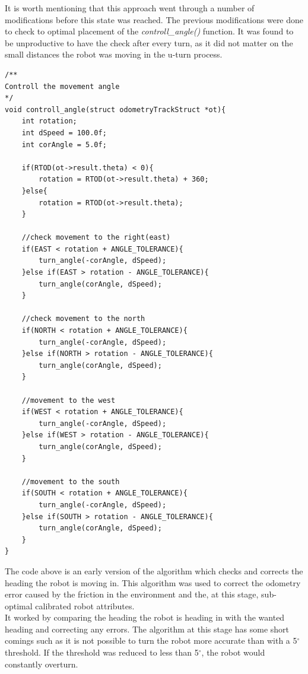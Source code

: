 It is worth mentioning that this approach went through a number of modifications before this state was reached. The previous modifications were done to check to optimal placement of the \textit{controll\_angle()} function. It was found to be unproductive to have the check after every turn, as it did not matter on the small distances the robot was moving in the u-turn process. \\

\begin{lstlisting}[caption={Early heading correction algorithm}, label={early_heading}]
 /**
Controll the movement angle
*/
void controll_angle(struct odometryTrackStruct *ot){
	int rotation;
	int dSpeed = 100.0f;
	int corAngle = 5.0f;

	if(RTOD(ot->result.theta) < 0){
		rotation = RTOD(ot->result.theta) + 360;
	}else{
		rotation = RTOD(ot->result.theta);
	}

	//check movement to the right(east)
	if(EAST < rotation + ANGLE_TOLERANCE){
		turn_angle(-corAngle, dSpeed);
	}else if(EAST > rotation - ANGLE_TOLERANCE){
		turn_angle(corAngle, dSpeed);
	}

	//check movement to the north
	if(NORTH < rotation + ANGLE_TOLERANCE){
		turn_angle(-corAngle, dSpeed);
	}else if(NORTH > rotation - ANGLE_TOLERANCE){
		turn_angle(corAngle, dSpeed);
	}

	//movement to the west
	if(WEST < rotation + ANGLE_TOLERANCE){
		turn_angle(-corAngle, dSpeed);
	}else if(WEST > rotation - ANGLE_TOLERANCE){
		turn_angle(corAngle, dSpeed);
	}

	//movement to the south
	if(SOUTH < rotation + ANGLE_TOLERANCE){
		turn_angle(-corAngle, dSpeed);
	}else if(SOUTH > rotation - ANGLE_TOLERANCE){
		turn_angle(corAngle, dSpeed);
	}
}
\end{lstlisting}
The code above is an early version of the algorithm which checks and corrects the heading the robot is moving in. This algorithm was used to correct the odometry error caused by the friction in the environment and the, at this stage, sub-optimal calibrated robot attributes. \\
It worked by comparing the heading the robot is heading in with the wanted heading and correcting any errors. The algorithm at this stage has some short comings such as it is not possible to turn the robot more accurate than with a 5$^{\circ}$ threshold. If the threshold was reduced to less than  5$^{\circ}$, the robot would constantly overturn. \\[3ex]

